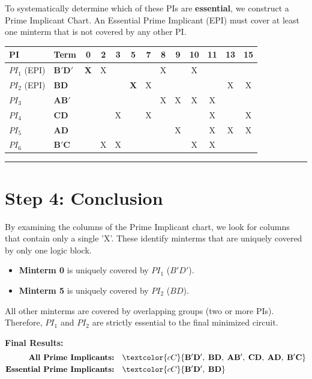 \documentclass[12pt,a3paper]{article}
\begin{document}
\begin{enumerate}
\begin{tcolorbox}[enhanced,breakable,ansbox,colback=cC!4,colframe=cC,boxrule=0.8pt,arc=5pt,title={\textbf{Answer}},fonttitle=\bfseries\color{white},colbacktitle=cC]
To systematically determine which of these PIs are \textbf{essential}, we construct a Prime Implicant Chart. An Essential Prime Implicant (EPI) must cover at least one minterm that is not covered by any other PI.

\begin{center}
\renewcommand{\arraystretch}{1.3}
\begin{tabular}{ll|ccccccccccc}
    \toprule
    \textbf{PI} & \textbf{Term} & \textbf{0} & \textbf{2} & \textbf{3} & \textbf{5} & \textbf{7} & \textbf{8} & \textbf{9} & \textbf{10} & \textbf{11} & \textbf{13} & \textbf{15} \\ 
    \midrule
    $PI_1$ (EPI) & $\mathbf{B'D'}$ & \textcolor{cC}{\textbf{X}} & X & & & & X & & X & & & \\
    $PI_2$ (EPI) & $\mathbf{BD}$ & & & & \textcolor{cC}{\textbf{X}} & X & & & & & X & X \\
    $PI_3$ & $\mathbf{AB'}$ & & & & & & X & X & X & X & & \\
    $PI_4$ & $\mathbf{CD}$ & & & X & & X & & & & X & & X \\
    $PI_5$ & $\mathbf{AD}$ & & & & & & & X & & X & X & X \\
    $PI_6$ & $\mathbf{B'C}$ & & X & X & & & & & X & X & & \\
    \bottomrule
\end{tabular}
\end{center}

\vspace{0.2cm}
\hrule
\vspace{0.4cm}

\section*{Step 4: Conclusion}

By examining the columns of the Prime Implicant chart, we look for columns that contain only a single 'X'. These identify minterms that are uniquely covered by only one logic block.
\begin{itemize}
    \item \textbf{Minterm 0} is uniquely covered by $PI_1$ ($B'D'$).
    \item \textbf{Minterm 5} is uniquely covered by $PI_2$ ($BD$).
\end{itemize}
All other minterms are covered by overlapping groups (two or more PIs). Therefore, $PI_1$ and $PI_2$ are strictly essential to the final minimized circuit.

\vspace{0.3cm}
\textbf{Final Results:}
\begin{align*}
    \text{\textbf{All Prime Implicants:}} \quad & \textcolor{cC}{\mathbf{B'D',\; BD,\; AB',\; CD,\; AD,\; B'C}} \\
    \text{\textbf{Essential Prime Implicants:}} \quad & \textcolor{cC}{\mathbf{B'D',\; BD}}
\end{align*}


\end{tcolorbox}
\end{enumerate}
\end{document}
